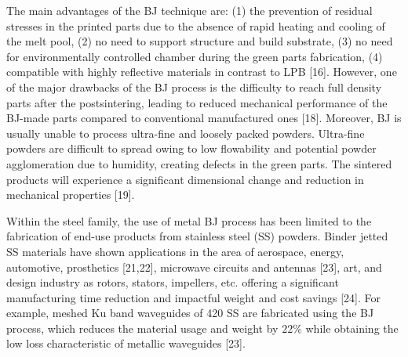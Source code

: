 \documentclass[10pt]{article}
\begin{document}
The main advantages of the BJ technique are: (1) the prevention of residual stresses in the printed parts due to the absence of rapid heating and cooling of the melt pool, (2) no need to support structure and build substrate, (3) no need for environmentally controlled chamber during the green parts fabrication, (4) compatible with highly reflective materials in contrast to LPB [16]. However, one of the major drawbacks of the BJ process is the difficulty to reach full density parts after the postsintering, leading to reduced mechanical performance of the BJ-made parts compared to conventional manufactured ones [18]. Moreover, BJ is usually unable to process ultra-fine and loosely packed powders. Ultra-fine powders are difficult to spread owing to low flowability and potential powder agglomeration due to humidity, creating defects in the green parts. The sintered products will experience a significant dimensional change and reduction in mechanical properties [19].

Within the steel family, the use of metal BJ process has been limited to the fabrication of end-use products from stainless steel (SS) powders. Binder jetted SS materials have shown applications in the area of aerospace, energy, automotive, prosthetics [21,22], microwave circuits and antennas [23], art, and design industry as rotors, stators, impellers, etc. offering a significant manufacturing time reduction and impactful weight and cost savings [24]. For example, meshed Ku band waveguides of 420 SS are fabricated using the BJ process, which reduces the material usage and weight by $22 \%$ while obtaining the low loss characteristic of metallic waveguides [23].
\end{document}
